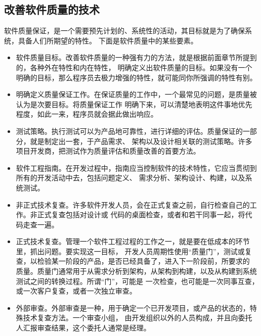 \documentclass{article}
\begin{document}
\subsection{改善软件质量的技术}
软件质量保证，是一个需要预先计划的、系统性的活动，其目标就是为了确保系统，具备人们所期望的特性。
下面是软件质量中的某些要素。
\begin{itemize}
    \item 软件质量目标。改善软件质量的一种强有力的方法，就是根据前面章节所提到的，各种外在特性和内在特性，
    明确定义出软件质量的目标。如果没有一个明确的目标，那么程序员去极力增强的特性，就可能同你所强调的特性有别。
    \item 明确定义质量保证工作。在保证质量的工作中，一个最常见的问题，是质量被认为是次要目标。将质量保证工作
    明确下来，可以清楚地表明这件事地优先程度，如此一来，程序员就会据此做出响应。
    \item 测试策略。执行测试可以为产品地可靠性，进行详细的评估。质量保证的一部分，就是制定出一套，于产品需求、
    架构以及设计相关联的测试策略。许多项目开发商，把测试作为质量评估和质量改善的首要方法。
    \item 软件工程指南。在开发过程中，指南应当控制软件的技术特性，它应当贯彻到所有的开发活动中去，包括问题定义、
    需求分析、架构设计、构建，以及系统测试。
    \item 非正式技术复查。许多软件开发人员，会在正式复查之前，自行检查自己的工作。非正式复查包括对设计或
    代码的桌面检查，或者和若干同事一起，将代码走查一遍。
    \item 正式技术复查。管理一个软件工程过程的工作之一，就是要在低成本的环节里，抓出问题。要实现这一目标，
    开发人员周期性使用“质量门”，测试或复查，以检验某一阶段的产品，是否已经具备了，进入下一阶段前，所要求的
    质量。质量门通常用于从需求分析到架构，从架构到构建，以及从构建到系统测试之间的转换过程。所谓“门”，可能是
    一次检查，也可能是一次同事互查，或一次客户复查，或者一次独立审查。
    \item 外部审查。外部审查是一种，用于确定一个已开发项目，或产品的状态的，特殊技术复查方法。一个审查小组，
    由开发组织以外的人员构成，并且向委托人汇报审查结果，这个委托人通常是经理。
\end{itemize}
\end{document}
